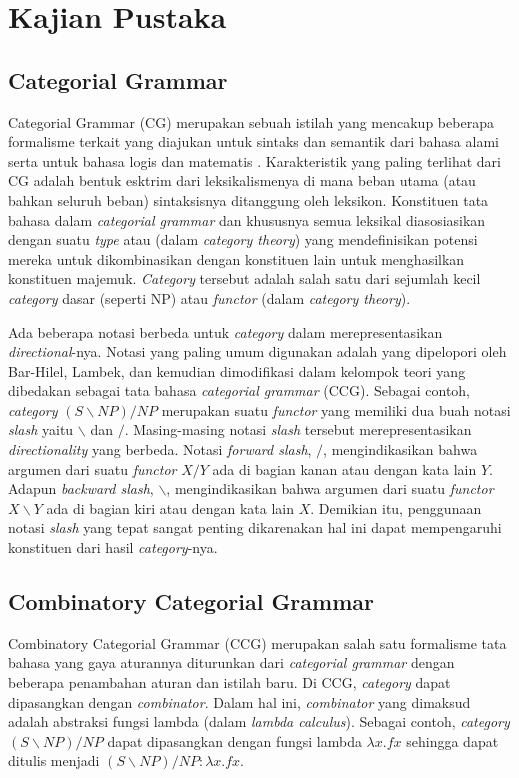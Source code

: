 \chapter{Kajian Pustaka}

\section{Categorial Grammar}
Categorial Grammar (CG) merupakan sebuah istilah yang mencakup beberapa formalisme terkait yang diajukan
untuk sintaks dan semantik dari bahasa alami serta untuk bahasa logis dan matematis \cite{Steedman92catg}.
Karakteristik yang paling terlihat dari CG adalah bentuk esktrim dari leksikalismenya di mana beban utama
(atau bahkan seluruh beban) sintaksisnya ditanggung oleh leksikon.
Konstituen tata bahasa dalam \textit{categorial grammar} dan khususnya semua leksikal diasosiasikan
dengan suatu \textit{type} atau  (dalam \textit{category theory}) yang
mendefinisikan potensi mereka untuk dikombinasikan dengan konstituen lain untuk menghasilkan konstituen
majemuk.
\textit{Category} tersebut adalah salah satu dari sejumlah kecil \textit{category} dasar (seperti NP)
atau \textit{functor} (dalam \textit{category theory}).

Ada beberapa notasi berbeda untuk \textit{category} dalam merepresentasikan \textit{directional}-nya.
Notasi yang paling umum digunakan adalah  yang dipelopori oleh Bar-Hilel,
Lambek, dan kemudian dimodifikasi dalam kelompok teori yang dibedakan sebagai tata bahasa
 \textit{categorial grammar} (CCG).
Sebagai contoh, \textit{category} $(S\backslash{}NP)/NP$ merupakan suatu \textit{functor} yang memiliki
dua buah notasi \textit{slash} yaitu $\backslash$ dan $/$.
Masing-masing notasi \textit{slash} tersebut merepresentasikan \textit{directionality} yang berbeda.
Notasi \textit{forward slash}, $/$, mengindikasikan bahwa argumen dari suatu \textit{functor}
$X/Y$ ada di bagian kanan atau dengan kata lain $Y$.
Adapun \textit{backward slash}, $\backslash$, mengindikasikan bahwa argumen dari suatu \textit{functor}
$X\backslash{}Y$ ada di bagian kiri atau dengan kata lain $X$.
Demikian itu, penggunaan notasi \textit{slash} yang tepat sangat penting dikarenakan hal ini dapat
mempengaruhi konstituen dari hasil  \textit{category}-nya.

\section{Combinatory Categorial Grammar}
Combinatory Categorial Grammar (CCG) merupakan salah satu formalisme tata bahasa yang gaya aturannya
diturunkan dari \textit{categorial grammar} dengan beberapa penambahan aturan dan istilah baru.
Di CCG, \textit{category} dapat dipasangkan dengan \textit{combinator}.
Dalam hal ini, \textit{combinator} yang dimaksud adalah abstraksi fungsi lambda
(dalam \textit{lambda calculus}).
Sebagai contoh, \textit{category} $(S\backslash{}NP)/NP$ dapat dipasangkan dengan fungsi lambda
$\lambda{x. fx}$ sehingga dapat ditulis menjadi $(S\backslash{}NP)/NP : \lambda{x. fx}$.


